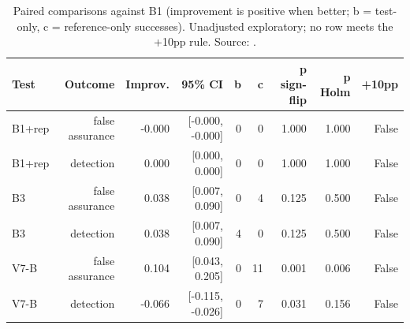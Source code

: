 \begin{table}[t]
\centering\scriptsize
\caption{Paired comparisons against B1 (improvement is positive when better; b = test-only, c = reference-only successes). Unadjusted exploratory; no row meets the +10pp rule. Source: .}
\label{tab:paired}
\begin{tabular}{lrrrrrrrr}
\hline
Test & Outcome & Improv. & 95\% CI & b & c & p sign-flip & p Holm & +10pp \\
\hline
B1+rep & false assurance & -0.000 & [-0.000, -0.000] & 0 & 0 & 1.000 & 1.000 & False \\
B1+rep & detection & 0.000 & [0.000, 0.000] & 0 & 0 & 1.000 & 1.000 & False \\
B3 & false assurance & 0.038 & [0.007, 0.090] & 0 & 4 & 0.125 & 0.500 & False \\
B3 & detection & 0.038 & [0.007, 0.090] & 4 & 0 & 0.125 & 0.500 & False \\
V7-B & false assurance & 0.104 & [0.043, 0.205] & 0 & 11 & 0.001 & 0.006 & False \\
V7-B & detection & -0.066 & [-0.115, -0.026] & 0 & 7 & 0.031 & 0.156 & False \\
\hline
\end{tabular}
\end{table}
